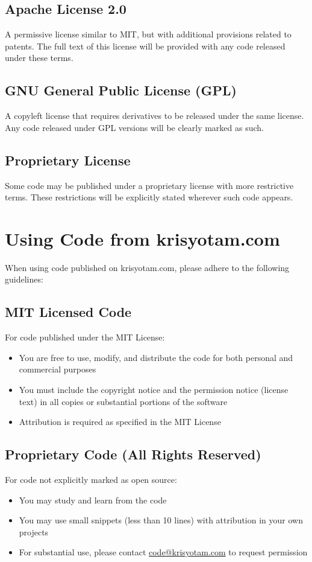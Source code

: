 \documentclass[11pt]{article}
\begin{document}
\subsection{Apache License 2.0}
A permissive license similar to MIT, but with additional provisions related to patents. The full text of this license will be provided with any code released under these terms.

\subsection{GNU General Public License (GPL)}
A copyleft license that requires derivatives to be released under the same license. Any code released under GPL versions will be clearly marked as such.

\subsection{Proprietary License}
Some code may be published under a proprietary license with more restrictive terms. These restrictions will be explicitly stated wherever such code appears.

\section{Using Code from krisyotam.com}
When using code published on krisyotam.com, please adhere to the following guidelines:

\subsection{MIT Licensed Code}
For code published under the MIT License:
\begin{itemize}
  \item You are free to use, modify, and distribute the code for both personal and commercial purposes
  \item You must include the copyright notice and the permission notice (license text) in all copies or substantial portions of the software
  \item Attribution is required as specified in the MIT License
\end{itemize}

\subsection{Proprietary Code (All Rights Reserved)}
For code not explicitly marked as open source:
\begin{itemize}
  \item You may study and learn from the code
  \item You may use small snippets (less than 10 lines) with attribution in your own projects
  \item For substantial use, please contact \href{mailto:code@krisyotam.com}{code@krisyotam.com} to request permission
\end{itemize}
\end{document}
